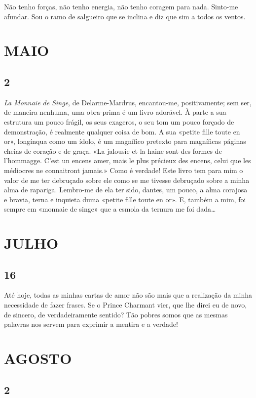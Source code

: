 Não tenho forças, não tenho energia, não tenho
coragem para nada. Sinto-me afundar. Sou o ramo de
salgueiro que se inclina e diz que sim a todos os
ventos.

\section{MAIO}

\subsection{2}

\textit{La Monnaie de Singe}, de Delarme-Mardrus,
encantou-me, positivamente; sem ser, de maneira 
nenhuma, uma obra-prima é um livro adorável. À parte a
sua estrutura um pouco frágil, os seus exageros, o seu
tom um pouco forçado de demonstração, é realmente
qualquer coisa de bom. A sua «petite fille toute en or»,
longínqua como um ídolo, é um magnífico pretexto para
magníficas páginas cheias de coração e de graça. «La
jalousie et la haine sont des formes de l’hommagge.
C’est un encens amer, mais le plus précieux des encens,
celui que les médiocres ne connaitront jamais.» Como
é verdade! Este livro tem para mim o valor de me ter
debruçado sobre ele como se me tivesse debruçado sobre
a minha alma de rapariga. Lembro-me de ela ter sido,
dantes, um pouco, a alma corajosa e bravia, terna e
inquieta duma «petite fille toute en or». E, também a
mim, foi sempre em «monnaie de singe» que a esmola
da ternura me foi dada\ldots

\section{JULHO}

\subsection{16} 

Até hoje, todas as minhas cartas de amor não
são mais que a realização da minha necessidade de fazer
frases. Se o Prince Charmant vier, que lhe direi eu
de novo, de sincero, de verdadeiramente sentido? Tão
pobres somos que as mesmas palavras nos servem para
exprimir a mentira e a verdade!

\section{AGOSTO}

\subsection{2} 

